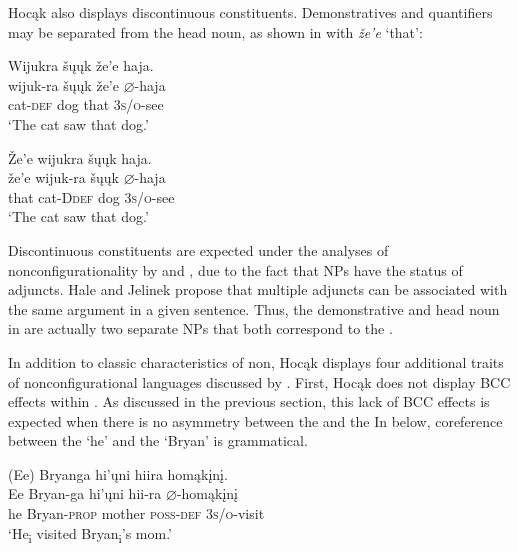 \documentclass[output=paper]{LSP/langsci}
\begin{document}
Hocąk also displays discontinuous constituents. Demonstratives and quantifiers may be separated from the head noun, as shown in  with \textit{\v{z}e'e} `that': 

\ea\label{ex:jrs:15}
\ea \label{ex:jrs:15a}
\glll Wijukra	\v{s}\k{u}\k{u}k	\v{z}e'e	haja. \\
wijuk-ra	\v{s}\k{u}\k{u}k	\v{z}e'e	$\varnothing$-haja \\
	cat-\textsc{def} 	dog	that		\textsc{3s/o}-see\\
\trans `The cat saw that dog.' 

\ex \label{ex:jrs:15b}
\glll \v{Z}e'e	wijukra	 \v{s}\k{u}\k{u}k	haja. \\
\v{z}e'e	wijuk-ra	\v{s}\k{u}\k{u}k	$\varnothing$-haja \\
that cat-D\textsc{def} dog \textsc{3s/o}-see \\
\trans `The cat saw that dog.'
\z 
\z 

Discontinuous constituents are expected under the analyses of nonconfigurationality by \citet{Hale1983} and \citet{Jelinek1984}, due to the fact that NPs have the status of adjuncts. Hale and Jelinek propose that multiple adjuncts can be associated with the same argument in a given sentence. Thus, the demonstrative and head noun in  are actually two separate NPs that both correspond to the .

In addition to  classic characteristics of non, Ho\-cąk displays four additional traits of nonconfigurational languages discussed by \citet{Baker1996}. First, Hocąk does not display BCC effects within .  As discussed in the previous section, this lack of BCC effects is expected when there is no asymmetry between the  and the  In  below, coreference between the  `he' and the  `Bryan' is grammatical.

\begin{exe}
\ex\label{ex:jrs:16}	
\glll (Ee) 	Bryanga 			hi'\k{u}ni 	hiira 				homąk\k{i}n\k{i}. \\
Ee 		Bryan-ga 		hi'\k{u}ni 	hii-ra 			$\varnothing$-homąk\k{i}n\k{i} \\
he 		Bryan-\textsc{prop} mother 	\textsc{poss-def} 	\textsc{3s/o}-visit  \\
\trans `He\textsubscript{i} visited Bryan\textsubscript{i}'s mom.'
\end{exe}
 
\end{document}
